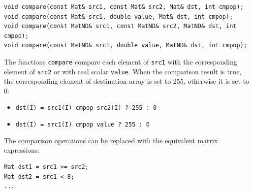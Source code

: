 \begin{lstlisting}
void compare(const Mat& src1, const Mat& src2, Mat& dst, int cmpop);
void compare(const Mat& src1, double value, Mat& dst, int cmpop);
void compare(const MatND& src1, const MatND& src2, MatND& dst, int cmpop);
void compare(const MatND& src1, double value, MatND& dst, int cmpop);
\end{lstlisting}
\begin{description}
\end{description}

The functions \texttt{compare} compare each element of \texttt{src1} with the corresponding element of \texttt{src2}
or with real scalar \texttt{value}. When the comparison result is true, the corresponding element of destination array is set to 255, otherwise it is set to 0:
\begin{itemize}
    \item \texttt{dst(I) = src1(I) cmpop src2(I) ? 255 : 0}
    \item \texttt{dst(I) = src1(I) cmpop value ? 255 : 0}
\end{itemize}

The comparison operations can be replaced with the equivalent matrix expressions:

\begin{lstlisting}
Mat dst1 = src1 >= src2;
Mat dst2 = src1 < 8;
...
\end{lstlisting}

